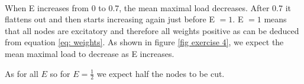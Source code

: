 \paragraph*{}
When E increases from 0 to 0.7, the mean maximal load decreases. After 0.7 it flattens out and then starts increasing again just before E $= 1$. E $=1$ means that all nodes are excitatory and therefore all weights positive as can be deduced from equation \ref{eq: weights}. As shown in figure \ref{fig exercise 4}, we expect the mean maximal load to decrease as E increases. 

As for all $E$ so for $E = \frac{1}{2}$ we expect half the nodes to be cut.



	